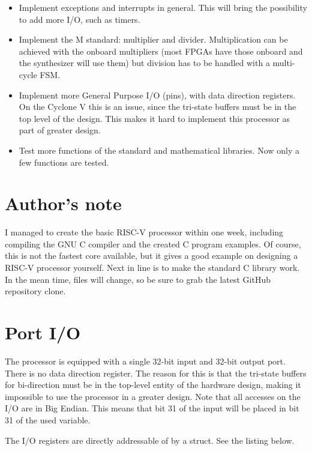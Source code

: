\documentclass[12pt]{article}
\begin{document}
\begin{itemize}
\item Implement exceptions and interrupts in general. This will bring the possibility to add more I/O, such as timers.
\item Implement the M standard: multiplier and divider. Multiplication can be achieved with the onboard multipliers (most FPGAs have those onboard and the synthesizer will use them) but division has to be handled with a multi-cycle FSM.
\item Implement more General Purpose I/O (pins), with data direction registers. On the Cyclone V this is an issue, since the tri-state buffers must be in the top level of the design. This makes it hard to implement this processor as part of greater design.
\item Test more functions of the standard and mathematical libraries. Now only a few functions are tested.
\end{itemize}

\section{Author's note}
I managed to create the basic RISC-V processor within one week, including compiling the GNU C compiler and the created C program examples. Of course, this is not the fastest core available, but it gives a good example on designing a RISC-V processor yourself. Next in line is to make the standard C library work. In the mean time, files will change, so be sure to grab the latest GitHub repository clone.

\appendix
\section{Port I/O}
The processor is equipped with a single 32-bit input and 32-bit output port. There is no data direction register. The reason for this is that the tri-state buffers for bi-direction must be in the top-level entity of the hardware design, making it impossible to use the processor in a greater design. Note that all accesses on the I/O are in Big Endian. This means that bit 31 of the input will be placed in bit 31 of the used variable.

The I/O registers are directly addressable of by a struct. See the listing below.
\end{document}
